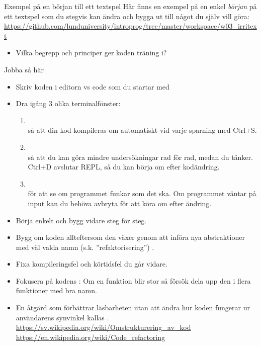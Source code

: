 \begin{SlideExtra}{Exempel på en början till ett textspel}
  Här finns en exempel på en enkel \emph{början} på ett textspel som du stegvis kan ändra och bygga ut till något du själv vill göra:
  \url{https://github.com/lunduniversity/introprog/tree/master/workspace/w03_irritext}

\begin{itemize}
  \item Vilka begrepp och principer ger koden träning i?
\end{itemize}

\end{SlideExtra}

\begin{SlideExtra}{Jobba så här}
\begin{itemize}\SlideFontTiny
  \item Skriv koden i editorn vs code som du startar med 
  \item Dra igång 3 olika terminalfönster:
  \begin{enumerate}\SlideFontTiny
  \item {}~\\så att din kod kompileras om automatiskt vid varje sparning med Ctrl+S.
  \item {}~\\så att du kan göra mindre undersökningar rad för rad, medan du tänker. Ctrl+D avslutar REPL, så du kan börja om efter kodändring.
  \item {}~\\för att se om programmet funkar som det ska. Om programmet väntar på input kan du behöva avbryta för att köra om efter ändring. 
  \end{enumerate}
  \item Börja enkelt och bygg vidare steg för steg.
  \item Bygg om koden allteftersom den växer genom att införa nya abstraktioner med väl valda namn (s.k. ''refaktorisering'') .
  \item Fixa  kompileringsfel och  körtidsfel  du går vidare.
  \item Fokusera på kodens : Om en funktion blir stor så försök dela upp den i flera funktioner med bra namn. 
  \item En åtgärd som förbättrar läsbarheten utan att ändra hur koden fungerar ur användarens synvinkel kallas  . \\\url{https://sv.wikipedia.org/wiki/Omstrukturering_av_kod}\\\url{https://en.wikipedia.org/wiki/Code_refactoring} 
\end{itemize}

\end{SlideExtra}

\fi
